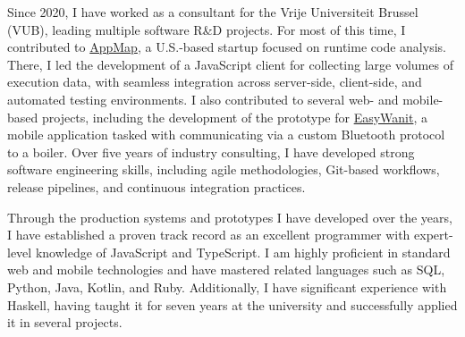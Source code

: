 \documentclass[a4paper,11pt,english]{article}
\newcommand{\ImplicitLink}[2]{\href{#1}{\textcolor{MarkerColour!80!black}{#2}}}
\begin{document}
\vspace{12pt}

Since 2020, I have worked as a consultant for the Vrije Universiteit Brussel (VUB), leading multiple software R\&D projects. For most of this time, I contributed to \ImplicitLink{https://appmap.io}{AppMap}, a U.S.-based startup focused on runtime code analysis. There, I led the development of a JavaScript client for collecting large volumes of execution data, with seamless integration across server-side, client-side, and automated testing environments. I also contributed to several web- and mobile-based projects, including the development of the prototype for \ImplicitLink{https://www.wanit.com/easywanit}{EasyWanit}, a mobile application tasked with communicating via a custom Bluetooth protocol to a boiler. Over five years of industry consulting, I have developed strong software engineering skills, including agile methodologies, Git-based workflows, release pipelines, and continuous integration practices.

\vspace{12pt}

Through the production systems and prototypes I have developed over the years, I have established a proven track record as an excellent programmer with expert-level knowledge of JavaScript and TypeScript. I am highly proficient in standard web and mobile technologies and have mastered related languages such as SQL, Python, Java, Kotlin, and Ruby. Additionally, I have significant experience with Haskell, having taught it for seven years at the university and successfully applied it in several projects.
\end{document}
